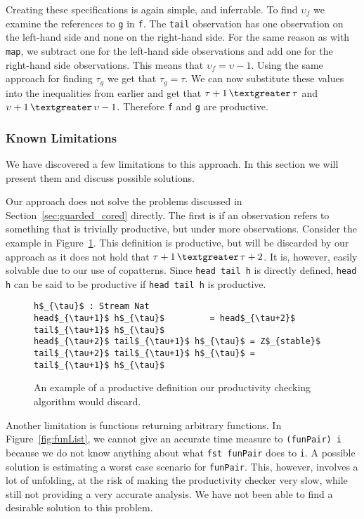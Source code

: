 Creating these specifications is again simple, and inferrable. To find $\upsilon_{f}$ we examine the references to \texttt{g} in \texttt{f}. The \texttt{tail} observation has one observation on the left-hand side and none on the right-hand side. For the same reason as with \texttt{map}, we subtract one for the left-hand side observations and add one for the right-hand side observations. This means that $\upsilon_{f} = \upsilon - 1$. Using the same approach for finding $\tau_{g}$ we get that $\tau_{g} = \tau$. We can now substitute these values into the inequalities from earlier and get that $\tau+1\,\textgreater\,\tau$ and $\upsilon+1\,\textgreater\,\upsilon - 1$. Therefore \texttt{f} and \texttt{g} are productive.

\subsubsection{Known Limitations}
We have discovered a few limitations to this approach. In this section we will present them and discuss possible solutions.

Our approach does not solve the problems discussed in Section~\ref{sec:guarded_cored} directly. The first is if an observation refers to something that is trivially productive, but under more observations. Consider the example in Figure~\ref{fig:forwardRef}. This definition is productive, but will be discarded by our approach as it does not hold that $\tau+1\,\textgreater\,\tau+2$. It is, however, easily solvable due to our use of copatterns. Since \texttt{head tail h} is directly defined, \texttt{head h} can be said to be productive if \texttt{head tail h} is productive.

\begin{figure}
\begin{Verbatim}[commandchars=\\\{\},codes={\catcode`$=3\catcode`_=8}]
h$_{\tau}$ : Stream Nat
head$_{\tau+1}$ h$_{\tau}$         = head$_{\tau+2}$ tail$_{\tau+1}$ h$_{\tau}$
head$_{\tau+2}$ tail$_{\tau+1}$ h$_{\tau}$ = Z$_{stable}$
tail$_{\tau+2}$ tail$_{\tau+1}$ h$_{\tau}$ = tail$_{\tau+1}$ h$_{\tau}$
\end{Verbatim}
\caption{An example of a productive definition our productivity checking algorithm would discard.}
\label{fig:forwardRef}
\end{figure}

Another limitation is functions returning arbitrary functions. In Figure~\ref{fig:funList}, we cannot give an accurate time measure to \texttt{(funPair) i} because we do not know anything about what \texttt{fst funPair} does to \texttt{i}. A possible solution is estimating a worst case scenario for \texttt{funPair}. This, however, involves a lot of unfolding, at the risk of making the productivity checker very slow, while still not providing a very accurate analysis. We have not been able to find a desirable solution to this problem.

